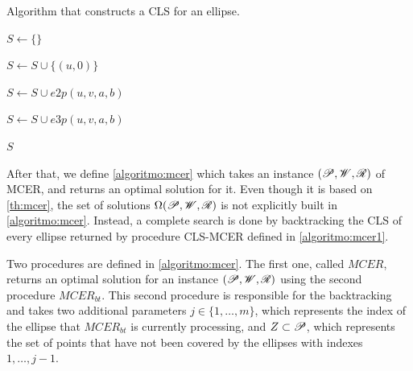 \begin{algoritmo}
	\caption{Algorithm that constructs a CLS for an ellipse.}\label{algoritmo:mcer1}
	\begin{algorithmic}[1]
		
		
		\item[]
		
		\State $S \gets \{\}$
		
		\State $S \gets S \cup \{(u, 0)\}$
		\EndFor
		
		\State $S \gets S \cup e2p(u, v, a, b)$
		\EndFor
		
		\State $S \gets S \cup e3p(u, v, a, b)$ 
		\EndFor
		
		\State \Return $S$
		\EndProcedure
	\end{algorithmic}
\end{algoritmo}

After that, we define \autoref{algoritmo:mcer} which takes an instance $(\mathscr{P}, \mathscr{W}, \mathscr{R})$ of MCER, and returns an optimal solution for it.
Even though it is based on \autoref{th:mcer}, the set of solutions $\Omega(\mathscr{P}, \mathscr{W}, \mathscr{R})$ is not explicitly built in \autoref{algoritmo:mcer}. Instead, a complete search is done by backtracking the CLS of every ellipse returned by procedure CLS-MCER defined in \autoref{algoritmo:mcer1}.

Two procedures are defined in \autoref{algoritmo:mcer}. The first one, called $MCER$, returns an optimal solution for an instance $(\mathscr{P}, \mathscr{W}, \mathscr{R})$ using the second procedure $MCER_{bt}$. This second procedure is responsible for the backtracking and takes two additional parameters $j\in\{1, \dots, m\}$, which represents the index of the ellipse that $MCER_{bt}$ is currently processing, and $Z\subset \mathscr{P}$, which represents the set of points that have not been covered by the ellipses with indexes $1, \dots, j-1$.


